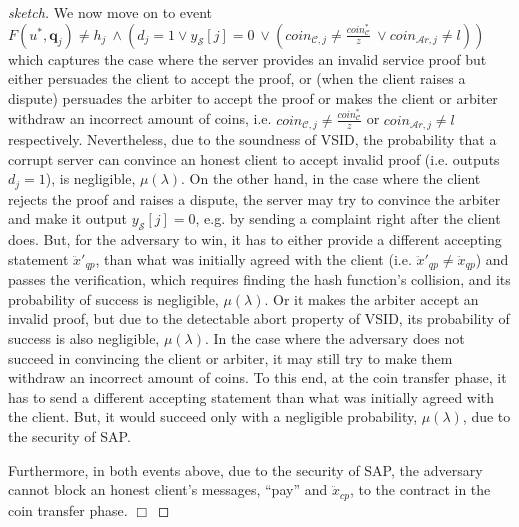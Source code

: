 \begin{proof}[sketch]
We now move on to event $F(u^{\scriptscriptstyle *}, \bm{q}_{\scriptscriptstyle j})\neq h_{\scriptscriptstyle j} \ \wedge (d_{\scriptscriptstyle j}=1	\vee y_{\scriptscriptstyle \mathcal S}[j]=0 \ \vee (coin_{\scriptscriptstyle\mathcal{C},j}\neq \frac{coin_{\scriptscriptstyle\mathcal C}^{\scriptscriptstyle*}}{z} \ \vee  coin_{\scriptscriptstyle\mathcal{A}r,j}\neq l))$ which captures the case where the server provides an invalid service proof but either persuades the client to accept the proof, or  (when the client raises a dispute)  persuades the arbiter to accept the proof or makes the client or arbiter withdraw an incorrect amount of coins, i.e.    $coin_{\scriptscriptstyle\mathcal{C},j}\neq \frac{coin_{\scriptscriptstyle\mathcal C}^{\scriptscriptstyle*}}{z}$ or $coin_{\scriptscriptstyle\mathcal{A}r,j}\neq l$ respectively.   Nevertheless, due to the soundness of VSID, the probability that a corrupt server can convince an honest client to accept invalid proof (i.e. outputs $d_{\scriptscriptstyle j}=1$), is negligible, $\mu(\lambda)$. On the other hand, in the case where the client rejects the proof and raises a dispute, the server may try to convince the arbiter and make it output $y_{\scriptscriptstyle \mathcal S}[j]=0$, e.g. by sending a complaint right after the client does. But, for the adversary to win, it has to either provide a different accepting statement $\ddot{x}'_{\scriptscriptstyle qp}$, than what was initially agreed with the client (i.e. $\ddot{x}'_{\scriptscriptstyle qp}\neq \ddot{x}_{\scriptscriptstyle qp}$) and passes the verification, which   requires finding the hash function's collision, and its probability of success is negligible, $\mu(\lambda)$. Or it makes the arbiter  accept an invalid proof, but due to the detectable abort property of VSID, its probability of success is also negligible, $\mu(\lambda)$. In the case where the adversary does not succeed in convincing the client or arbiter, it may still try to  make them withdraw an incorrect amount of coins. To this end, at the coin transfer phase, it has to send a  different accepting statement  than what was initially agreed with the client. But, it would succeed only with a negligible probability, $\mu(\lambda)$, due to the security of SAP. 

Furthermore, in   both  events above, due to the security of SAP, the adversary cannot block an honest client's  messages, ``pay'' and $\ddot{x}_{\scriptscriptstyle cp}$, to the contract in the coin transfer phase.
  \hfill\(\Box\)\end{proof}



